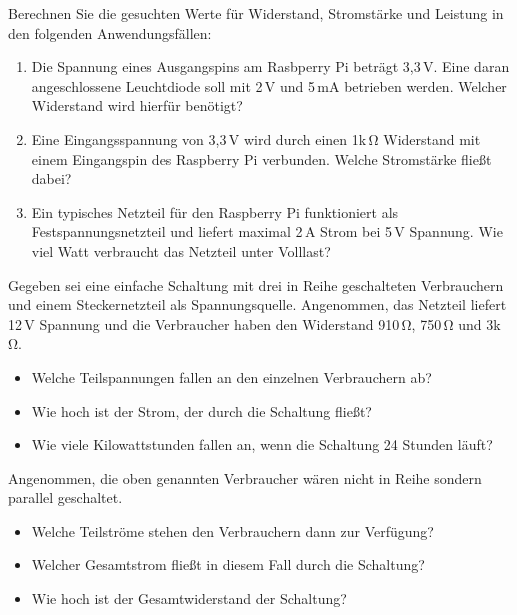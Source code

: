 \bigskip
\teilaufgabe
Berechnen Sie die gesuchten Werte für Widerstand, Stromstärke und Leistung in den
folgenden Anwendungsfällen:

\begin{enumerate}
    \item Die Spannung eines Ausgangspins am Rasbperry Pi beträgt 3,3\,V. Eine
    daran angeschlossene Leuchtdiode soll mit 2\,V und 5\,mA betrieben werden.
    Welcher Widerstand wird hierfür benötigt?

    \item Eine Eingangsspannung von 3,3\,V wird durch einen 1k\,\si{\ohm} Widerstand
    mit einem Eingangspin des Raspberry Pi verbunden. Welche Stromstärke fließt
    dabei?

    \item Ein typisches Netzteil für den Raspberry Pi funktioniert als
    Festspannungsnetzteil und liefert maximal 2\,A Strom bei 5\,V Spannung.
    Wie viel Watt verbraucht das Netzteil unter Volllast?
\end{enumerate}

\teilaufgabe
Gegeben sei eine einfache Schaltung mit drei in Reihe geschalteten Verbrauchern
und einem Steckernetzteil als Spannungsquelle. Angenommen, das Netzteil liefert
12\,V Spannung und die Verbraucher haben den Widerstand 910\,\si{\ohm}, 750\,\si{\ohm}
und 3k\,\si{\ohm}.

\begin{itemize}
    \item Welche Teilspannungen fallen an den einzelnen Verbrauchern ab?
    \item Wie hoch ist der Strom, der durch die Schaltung fließt?
    \item Wie viele Kilowattstunden fallen an, wenn die Schaltung 24 Stunden läuft?
\end{itemize}

\bigskip
\teilaufgabe
Angenommen, die oben genannten Verbraucher wären nicht in Reihe sondern parallel
geschaltet.

\begin{itemize}
    \item Welche Teilströme stehen den Verbrauchern dann zur Verfügung?
    \item Welcher Gesamtstrom fließt in diesem Fall durch die Schaltung?
    \item Wie hoch ist der Gesamtwiderstand der Schaltung?
\end{itemize}

